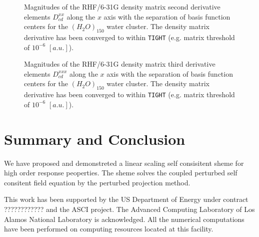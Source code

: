 \documentclass[prl,aps,twocolumn,showpacs,twocolumngrid,superbib]{revtex4}
\begin{document}
\begin{figure}[t]
  \caption{\protect
    Magnitudes of the RHF/6-31G density matrix second derivative elements $D^{xx}_{cd}$
    along the $x$ axis with the separation of basis function centers
    for the $(H_2O)_{150}$ water cluster. The density matrix 
    derivative has been converged to within {\tt TIGHT} (e.g. 
    matrix threshold of $10^{-6}$ $[a.u.]$).
  }\label{fig:Alpha_Decay}
\end{figure}


\begin{figure}[t]
  \caption{\protect
    Magnitudes of the RHF/6-31G density matrix third derivative elements $D^{xxx}_{cd}$
    along the $x$ axis with the separation of basis function centers
    for the $(H_2O)_{150}$ water cluster. The density matrix 
    derivative has been converged to within {\tt TIGHT} (e.g. 
    matrix threshold of $10^{-6}$ $[a.u.]$).
  }\label{fig:Alpha_Decay}
\end{figure}




\section{Summary and Conclusion}


 We have proposed and demonstreted a linear scaling self
 consisitent sheme for high order response peoperties.
 The sheme solves the coupled perturbed self consitent field 
 equation by the perturbed projection method.



\begin{acknowledgments}
 This work has been supported by the US Department of Energy 
 under contract ???????????? and the ASCI project.  
 The Advanced Computing Laboratory of Los 
 Alamos National Laboratory is acknowledged.
 All the numerical computations have been
 performed on computing resources located at this facility.
\end{acknowledgments}

\end{document}

